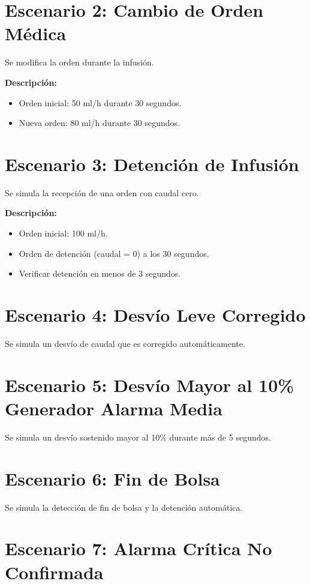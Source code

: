 \documentclass[12pt,a4paper,oneside]{report}
\begin{document}
\section{Escenario 2: Cambio de Orden Médica}

Se modifica la orden durante la infusión.

\textbf{Descripción:}
\begin{itemize}
    \item Orden inicial: 50 ml/h durante 30 segundos.
    \item Nueva orden: 80 ml/h durante 30 segundos.
\end{itemize}

\section{Escenario 3: Detención de Infusión}

Se simula la recepción de una orden con caudal cero.

\textbf{Descripción:}
\begin{itemize}
    \item Orden inicial: 100 ml/h.
    \item Orden de detención (caudal = 0) a los 30 segundos.
    \item Verificar detención en menos de 3 segundos.
\end{itemize}

\section{Escenario 4: Desvío Leve Corregido}

Se simula un desvío de caudal que es corregido automáticamente.

\section{Escenario 5: Desvío Mayor al 10\% Generador Alarma Media}

Se simula un desvío sostenido mayor al 10\% durante más de 5 segundos.

\section{Escenario 6: Fin de Bolsa}

Se simula la detección de fin de bolsa y la detención automática.

\section{Escenario 7: Alarma Crítica No Confirmada}
\end{document}
